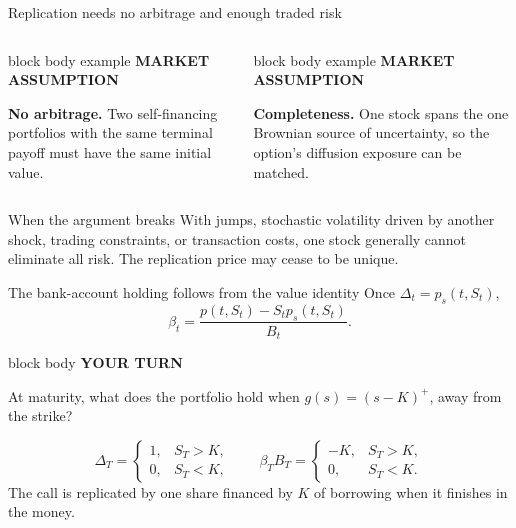 \documentclass[handout,10pt,aspectratio=169]{beamer}
\newenvironment{marketbox}{%
  \begin{beamercolorbox}[rounded=true,sep=0.7em,wd=\textwidth]{block body example}
  \textbf{\color{CourseGreen}MARKET ASSUMPTION}\quad
}{\end{beamercolorbox}}
\newenvironment{pausebox}{%
  \begin{beamercolorbox}[rounded=true,sep=0.8em,wd=\textwidth]{block body}
  \textbf{\color{CourseGold}YOUR TURN}\quad
}{\end{beamercolorbox}}
\newcommand{\1}{\mathbf 1}
\begin{document}
\begin{frame}{Replication needs no arbitrage and enough traded risk}
\begin{columns}[T,onlytextwidth]
\begin{marketbox}
\textbf{No arbitrage.} Two self-financing portfolios with the same terminal
payoff must have the same initial value.
\end{marketbox}
\begin{marketbox}
\textbf{Completeness.} One stock spans the one Brownian source of uncertainty,
so the option's diffusion exposure can be matched.
\end{marketbox}
\end{columns}
\medskip
\begin{alertblock}{When the argument breaks}
With jumps, stochastic volatility driven by another shock, trading
constraints, or transaction costs, one stock generally cannot eliminate all
risk. The replication price may cease to be unique.
\end{alertblock}
\end{frame}

\begin{frame}{The bank-account holding follows from the value identity}
Once \(\Delta_t=p_s(t,S_t)\),
\[
\beta_t
=\frac{p(t,S_t)-S_tp_s(t,S_t)}{B_t}.
\]
\begin{pausebox}
At maturity, what does the portfolio hold when \(g(s)=(s-K)^+\), away from
the strike?
\end{pausebox}

\[
\Delta_T=
\begin{cases}1,&S_T>K,\\0,&S_T<K,\end{cases}
\qquad
\beta_TB_T=
\begin{cases}-K,&S_T>K,\\0,&S_T<K.\end{cases}
\]
The call is replicated by one share financed by \(K\) of borrowing when it
finishes in the money.
\end{frame}
\end{document}
